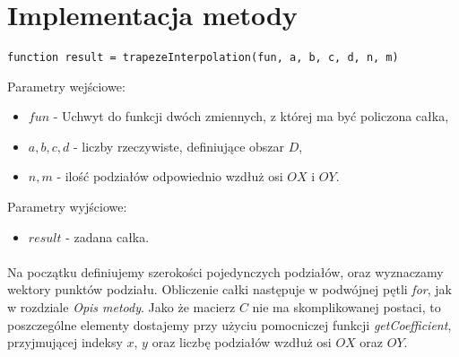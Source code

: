 \documentclass{article}
\begin{document}
\section{Implementacja metody}
\paragraph{}
\begin{lstlisting}[style=Matlab-editor]
function result = trapezeInterpolation(fun, a, b, c, d, n, m)
\end{lstlisting}
\vspace{4pt}
Parametry wejściowe:
\begin{itemize}
\item $fun$ - Uchwyt do funkcji dwóch zmiennych, z której ma być policzona całka,
\item $a,b,c,d$ - liczby rzeczywiste, definiujące obszar $D$,
\item $n,m$ - ilość podziałów odpowiednio wzdłuż osi $OX$ i $OY$.
\end{itemize}
Parametry wyjściowe:
\begin{itemize}
\item $result$ - zadana całka.
\end{itemize}
\paragraph{}
Na początku definiujemy szerokości pojedynczych podziałów, oraz wyznaczamy wektory punktów podziału. Obliczenie całki następuje w podwójnej pętli \textit{for}, jak w rozdziale \textit{Opis metody}. Jako że macierz $C$ nie ma skomplikowanej postaci, to poszczególne elementy dostajemy przy użyciu pomocniczej funkcji \textit{getCoefficient}, przyjmującej indeksy $x$, $y$ oraz liczbę podziałów wzdłuż osi $OX$ oraz $OY$.
\end{document}
